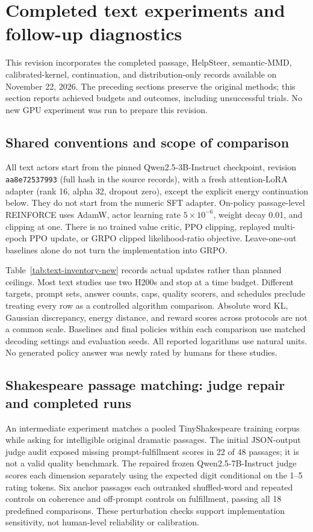 \section{Completed text experiments and follow-up diagnostics}
\label{sec:newresults}
This revision incorporates the completed passage, HelpSteer, semantic-MMD,
calibrated-kernel, continuation, and distribution-only records available on
November 22, 2026. The preceding sections preserve the original methods;
this section reports achieved budgets and outcomes, including unsuccessful
trials. No new GPU experiment was run to prepare this revision.

\subsection{Shared conventions and scope of comparison}
All text actors start from the pinned Qwen2.5-3B-Instruct checkpoint,
revision \texttt{aa8e72537993} (full hash in the source records), with a fresh
attention-LoRA adapter (rank 16, alpha 32, dropout zero), except the
explicit energy continuation below. They do not start from the numeric
SFT adapter. On-policy passage-level REINFORCE uses AdamW, actor learning
rate $5\times10^{-6}$, weight decay 0.01, and clipping at one.
There is no trained value critic, PPO clipping, replayed multi-epoch PPO
update, or GRPO clipped likelihood-ratio objective. Leave-one-out
baselines alone do not turn the implementation into GRPO.

Table~\ref{tab:text-inventory-new} records actual updates rather than
planned ceilings. Most text studies use two H200s and stop at a time
budget. Different targets, prompt sets, answer counts, caps, quality
scorers, and schedules preclude treating every row as a controlled
algorithm comparison. Absolute word KL, Gaussian discrepancy, energy
distance, and reward scores across protocols are not a common scale.
Baselines and final policies within each comparison use matched decoding
settings and evaluation seeds. All reported logarithms use natural units.
No generated policy answer was newly rated by humans for these studies.


\subsection{Shakespeare passage matching: judge repair and completed runs}
An intermediate experiment matches a pooled TinyShakespeare training
corpus while asking for intelligible original dramatic passages. The
initial JSON-output judge audit exposed missing prompt-fulfillment scores
in 22 of 48 passages; it is not a valid quality benchmark. The repaired
frozen Qwen2.5-7B-Instruct judge scores each dimension separately using
the expected digit conditional on the 1--5 rating tokens. Six anchor
passages each outranked shuffled-word and repeated controls on coherence
and off-prompt controls on fulfillment, passing all 18 predefined
comparisons. These perturbation checks support implementation sensitivity,
not human-level reliability or calibration.

